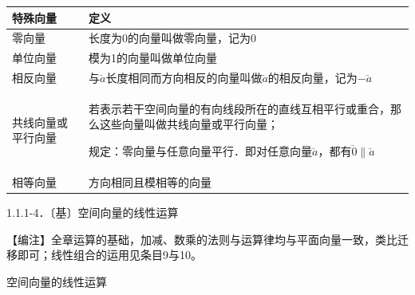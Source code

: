 {\def\LTcaptype{none} %
\begin{longtable}[]{@{}
  >{\raggedright\arraybackslash}p{}
  >{\raggedright\arraybackslash}p{}@{}}
\toprule\noalign{}
\begin{minipage}[b]{\linewidth}\raggedright
特殊向量
\end{minipage} & \begin{minipage}[b]{\linewidth}\raggedright
定义
\end{minipage} \\
\midrule\noalign{}
\endhead
\bottomrule\noalign{}
\endlastfoot
零向量 & 长度为0的向量叫做零向量，记为0 \\
单位向量 & 模为1的向量叫做单位向量 \\
相反向量 &
与\(\overset{⃑}{a}\)长度相同而方向相反的向量叫做\(\overset{⃑}{a}\)的相反向量，记为\(- \overset{⃑}{a}\) \\
共线向量或平行向量 &
若表示若干空间向量的有向线段所在的直线互相平行或重合，那么这些向量叫做共线向量或平行向量；

规定：零向量与任意向量平行．即对任意向量\(\overset{⃑}{a}\)，都有\(\overset{⃑}{0} \parallel \overset{⃑}{a}\) \\
相等向量 & 方向相同且模相等的向量 \\
\end{longtable}
}

1.1.1-4．〔基〕空间向量的线性运算

【⁠编⁠注⁠】全章运算的基础，加减、数乘的法则与运算律均与平面向量一致，类比迁移即可；线性组合的运用见条目9与10。

空间向量的线性运算

